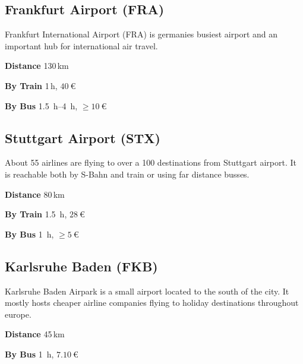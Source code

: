 \begin{multicols}{2}
\raggedcolumns

\subsection{Frankfurt Airport (FRA)}

Frankfurt International Airport (FRA) is germanies busiest airport and an important hub for
international air travel.
\begin{labeling}{\hspace*{10ex}}
  \item[\bf Distance] 130\,km
  \item[\bf By Train] 1\,h, $\SI{40}{\euro}$
  \item[\bf By Bus] \SI{1.5}{h}–\SI{4}{h}, $\ge\SI{10}{\euro}$
\end{labeling}

\subsection{Stuttgart Airport (STX)}

About 55 airlines are flying to over a 100 destinations from Stuttgart airport.
It is reachable both by S-Bahn and train or using far distance busses.

\begin{labeling}{\hspace*{10ex}}
  \item[\bf Distance] 80\,km
  \item[\bf By Train] \SI{1.5}{\hour}, $\SI{28}{\euro}$
  \item[\bf By Bus] \SI{1}{\hour}, $\ge\SI{5}{\euro}$
\end{labeling}

\subsection{Karlsruhe Baden (FKB)}

Karlsruhe Baden Airpark is a small airport located to the south of the city. It
mostly hosts cheaper airline companies flying to holiday destinations
throughout europe.

\begin{labeling}{\hspace*{10ex}}
  \item[\bf Distance] 45\,km
  \item[\bf By Bus] \SI{1}{\hour}, $\SI{7.10}{\euro}$
\end{labeling}


\end{multicols}

